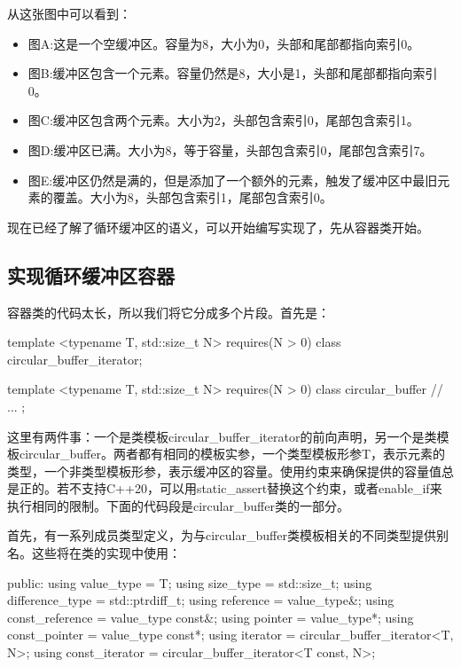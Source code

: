 从这张图中可以看到：

\begin{itemize}
  \item 图A:这是一个空缓冲区。容量为8，大小为0，头部和尾部都指向索引0。
  \item 图B:缓冲区包含一个元素。容量仍然是8，大小是1，头部和尾部都指向索引0。
  \item 图C:缓冲区包含两个元素。大小为2，头部包含索引0，尾部包含索引1。
  \item 图D:缓冲区已满。大小为8，等于容量，头部包含索引0，尾部包含索引7。
  \item 图E:缓冲区仍然是满的，但是添加了一个额外的元素，触发了缓冲区中最旧元素的覆盖。大小为8，头部包含索引1，尾部包含索引0。
\end{itemize}

现在已经了解了循环缓冲区的语义，可以开始编写实现了，先从容器类开始。

\subsection{实现循环缓冲区容器}

容器类的代码太长，所以我们将它分成多个片段。首先是：

\begin{cpp}
template <typename T, std::size_t N>
	requires(N > 0)
class circular_buffer_iterator;

template <typename T, std::size_t N>
	requires(N > 0)
class circular_buffer
{
	// ...
};
\end{cpp}

这里有两件事：一个是类模板circular\_buffer\_iterator的前向声明，另一个是类模板circular\_buffer。两者都有相同的模板实参，一个类型模板形参T，表示元素的类型，一个非类型模板形参，表示缓冲区的容量。使用约束来确保提供的容量值总是正的。若不支持C++20，可以用static\_assert替换这个约束，或者enable\_if来执行相同的限制。下面的代码段是circular\_buffer类的一部分。

首先，有一系列成员类型定义，为与circular\_buffer类模板相关的不同类型提供别名。这些将在类的实现中使用：

\begin{cpp}
	public:
	using value_type = T;
	using size_type = std::size_t;
	using difference_type = std::ptrdiff_t;
	using reference = value_type&;
	using const_reference = value_type const&;
	using pointer = value_type*;
	using const_pointer = value_type const*;
	using iterator = circular_buffer_iterator<T, N>;
	using const_iterator =
	circular_buffer_iterator<T const, N>;
\end{cpp}

